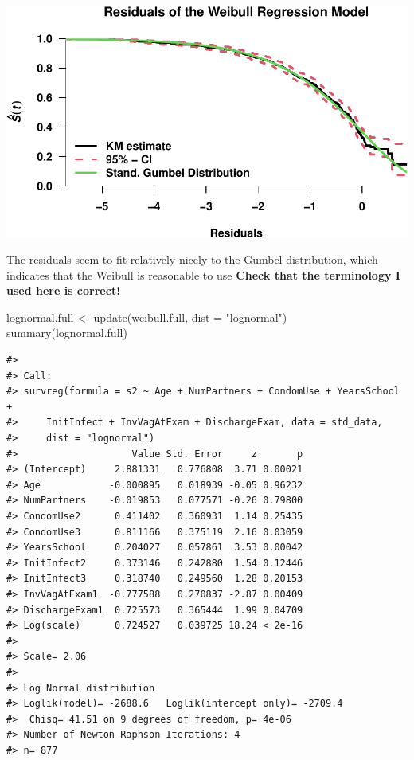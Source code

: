 \documentclass[
]{article}
\newenvironment{Shaded}{\begin{snugshade}}{\end{snugshade}}
\newcommand{\AttributeTok}[1]{\textcolor[rgb]{0.77,0.63,0.00}{#1}}
\newcommand{\FunctionTok}[1]{\textcolor[rgb]{0.00,0.00,0.00}{#1}}
\newcommand{\NormalTok}[1]{#1}
\newcommand{\OtherTok}[1]{\textcolor[rgb]{0.56,0.35,0.01}{#1}}
\newcommand{\StringTok}[1]{\textcolor[rgb]{0.31,0.60,0.02}{#1}}
\begin{document}
\includegraphics{practical_files/figure-latex/unnamed-chunk-14-1.pdf}

The residuals seem to fit relatively nicely to the Gumbel distribution, which indicates that the Weibull is reasonable to use \textbf{Check that the terminology I used here is correct!}

\begin{Shaded}
\begin{Highlighting}[]
\NormalTok{lognormal.full }\OtherTok{\textless{}{-}} \FunctionTok{update}\NormalTok{(weibull.full, }\AttributeTok{dist =} \StringTok{"lognormal"}\NormalTok{)}
\FunctionTok{summary}\NormalTok{(lognormal.full)}
\end{Highlighting}
\end{Shaded}

\begin{verbatim}
#> 
#> Call:
#> survreg(formula = s2 ~ Age + NumPartners + CondomUse + YearsSchool + 
#>     InitInfect + InvVagAtExam + DischargeExam, data = std_data, 
#>     dist = "lognormal")
#>                    Value Std. Error     z       p
#> (Intercept)     2.881331   0.776808  3.71 0.00021
#> Age            -0.000895   0.018939 -0.05 0.96232
#> NumPartners    -0.019853   0.077571 -0.26 0.79800
#> CondomUse2      0.411402   0.360931  1.14 0.25435
#> CondomUse3      0.811166   0.375119  2.16 0.03059
#> YearsSchool     0.204027   0.057861  3.53 0.00042
#> InitInfect2     0.373146   0.242880  1.54 0.12446
#> InitInfect3     0.318740   0.249560  1.28 0.20153
#> InvVagAtExam1  -0.777588   0.270837 -2.87 0.00409
#> DischargeExam1  0.725573   0.365444  1.99 0.04709
#> Log(scale)      0.724527   0.039725 18.24 < 2e-16
#> 
#> Scale= 2.06 
#> 
#> Log Normal distribution
#> Loglik(model)= -2688.6   Loglik(intercept only)= -2709.4
#>  Chisq= 41.51 on 9 degrees of freedom, p= 4e-06 
#> Number of Newton-Raphson Iterations: 4 
#> n= 877
\end{verbatim}
\end{document}
